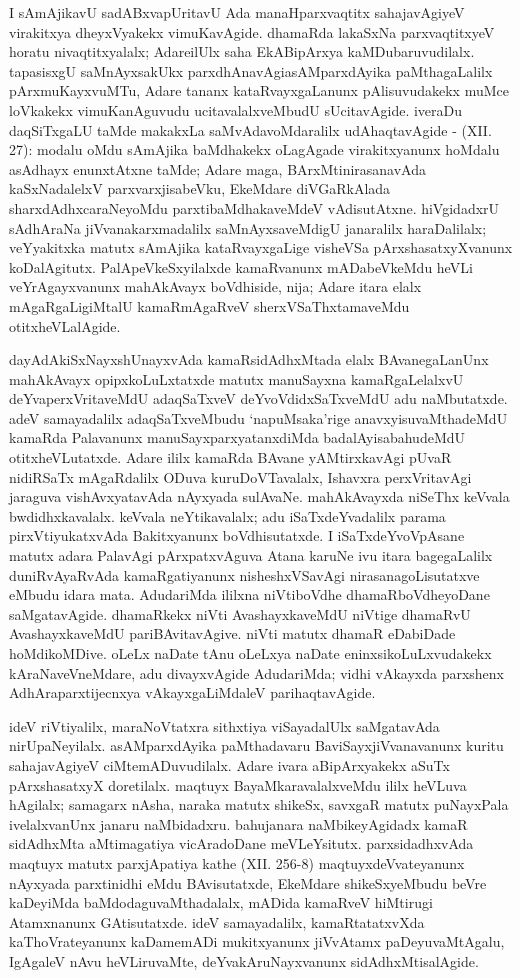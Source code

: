 I sAmAjikavU sadABxvapUritavU Ada manaHparxvaqtitx sahajavAgiyeV vira\-kitxya dheyxVyakekx vimuKavAgide. dhamaRda lakaSxNa parxvaqtitxyeV horatu nivaqtitxyalalx; Adare\break ilUlx saha EkABipArxya kaMDubaruvudilalx. tapasisxgU saMnAyxsakUkx parxdhAnavAgi\break asAMparxdAyika paMthagaLalilx pArxmuKayxvuMTu, Adare tananx kataRvayxgaLanunx pAlisuvu\-dakekx muMce loVkakekx vimuKanAguvudu ucitavalalxveMbudU sUcitavAgide. iveraDu daqSiTxgaLU taMde makakxLa saMvAdavoMdaralilx udAhaqtavAgide - {\rm(XII. 27)}: modalu oMdu sAmAjika baMdhakekx oLagAgade virakitxyanunx hoMdalu asAdhayx enunxtAtxne taMde; Adare maga, BArxMtinirasanavAda kaSxNadalelxV parxvarxjisabeVku, EkeMdare diVGaRkAlada sharxdAdhxcaraNeyoMdu parxtibaMdhakaveMdeV vAdisutAtxne. hiVgidadxrU sAdhAraNa jiVvanakarxmadalilx saMnAyxsaveMdigU janaralilx haraDalilalx; veYyakitxka matutx sAmAjika kataRvayxgaLige visheVSa pArxshasatxyXvanunx koDalAgitutx. PalApeVkeSxyilalxde kamaRvanunx mADabeVkeMdu heVLi veYrAgayxvanunx mahAkAvayx boVdhiside, nija; Adare itara elalx mAgaRgaLigiMtalU kamaRmAgaRveV sherxVSaThxtamaveMdu otitxheVLalAgide.

dayAdAkiSxNayxshUnayxvAda kamaRsidAdhxMtada elalx BAvanegaLanUnx mahAkAvayx opipxkoLuLxtatxde matutx manuSayxna kamaRgaLelalxvU deYvaperxVritaveMdU adaqSaTxveV deYvoVdidxSaTxveMdU adu naMbutatxde. adeV samayadalilx adaqSaTxveMbudu `napuMsaka'rige anavxyisuvaMthadeMdU kamaRda Palavanunx manuSayxparxyatanxdiMda badalAyisabahudeMdU otitxheVLutatxde. Adare ililx kamaRda BAvane yAMtirxkavAgi pUvaR nidiRSaTx mAgaRdalilx ODuva kuruDoVTavalalx, Ishavxra perxVritavAgi jaraguva vishAvxyatavAda nAyxyada sulAvaNe. mahAkAvayxda niSeThx keVvala bwdidhxkavalalx. keVvala neYtikavalalx; adu iSaTxdeYvadalilx parama pirxVtiyukatxvAda Bakitxyanunx boVdhisutatxde. I iSaTxdeYvoVpAsane matutx adara PalavAgi pArxpatxvAguva Atana karuNe ivu itara bagegaLalilx duniRvAyaRvAda kamaRgatiyanunx nisheshxVSavAgi nirasanagoLisutatxve eMbudu idara mata. AdudariMda ililxna niVtiboVdhe dhamaRboVdheyoDane saMgatavAgide. dhamaRkekx niVti AvashayxkaveMdU niVtige dhamaRvU AvashayxkaveMdU pariBAvitavAgive. niVti matutx dhamaR eDabiDade hoMdikoMDive. oLeLx naDate tAnu oLeLxya naDate eninxsikoLuLxvudakekx kAraNaveVneMdare, adu divayxvAgide AdudariMda; vidhi vAkayxda parxshenx AdhAraparxtijecnxya vAkayxgaLiMdaleV parihaqtavAgide.

ideV riVtiyalilx, maraNoVtatxra sithxtiya viSayadalUlx saMgatavAda nirUpaNe\-yilalx. asAMparxdAyika paMthadavaru BaviSayxjiVvanavanunx kuritu sahajavAgiyeV ciMtemADuvudilalx. Adare ivara aBipArxyakekx aSuTx pArxshasatxyX doretilalx. maqtuyx BayaMkaravalalxveMdu ililx heVLuva hAgilalx; samagarx nAsha, naraka matutx shikeSx, savxgaR matutx puNayxPala ivelalxvanUnx janaru naMbidadxru. bahujanara naMbikeyAgidadx kamaR sidAdhxMta aMtimagatiya vicAradoDane meVLeYsitutx. parxsidadhxvAda maqtuyx matutx parxjApatiya kathe {\rm(XII. 256-8)} maqtuyxdeVvateyanunx nAyxyada parxtinidhi eMdu BAvisutatxde, EkeMdare shikeSxyeMbudu beVre kaDeyiMda baMdodaguvaMthadalalx, mADida kamaRveV hiMtirugi Atamxnanunx GAtisutatxde. ideV samayadalilx, kamaRtatatxvXda kaThoVrateyanunx kaDamemADi mukitxyanunx jiVvAtamx paDeyuvaMtAgalu, IgAgaleV nAvu heVLiruvaMte, deYvakAruNayxvanunx sidAdhxMtisalAgide.


